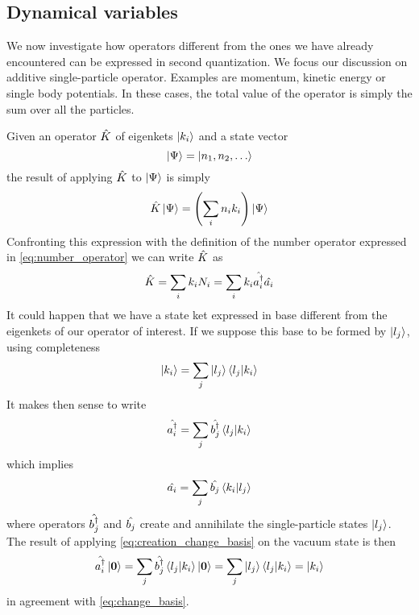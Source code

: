 \subsection{Dynamical variables}
We now investigate how operators different from the ones we have already encountered can be expressed in second quantization. We focus our discussion on additive single-particle operator. Examples are momentum, kinetic energy or single body potentials. In these cases, the total value of the operator is simply the sum over all the particles.

Given an operator $\hat{K}$ of eigenkets $\ket{k_i}$ and a state vector
\begin{equation}
    \ket{\Psi} = \ket{n_1, n_2, \dots}
\end{equation}
the result of applying $\hat{K}$ to $\ket{\Psi}$ is simply
\begin{equation}
    \hat{K}\ket{\Psi} = \left( \sum_i n_i k_i \right) \ket{\Psi}
\end{equation}
Confronting this expression with the definition of the number operator expressed in \cref{eq:number_operator} we can write $\hat{K}$ as
\begin{equation}
    \hat{K} = \sum_i k_i N_i = \sum_i k_i  \hat{a_i^\dagger}\hat{a_i}
\end{equation}
It could happen that we have a state ket expressed in base different from the eigenkets of our operator of interest. If we suppose this base to be formed by $\ket{l_j}$, using completeness
\begin{equation} \label{eq:change_basis}
    \ket{k_i} = \sum_j \ket{l_j} \braket{l_j}{k_i}
\end{equation}
It makes then sense to write
\begin{equation} \label{eq:creation_change_basis}
    \hat{a_i^\dagger} = \sum_j \hat{b_j^\dagger} \braket{l_j}{k_i}
\end{equation}
which implies
\begin{equation}
    \hat{a_i} = \sum_j \hat{b_j} \braket{k_i}{l_j}
\end{equation}
where operators $\hat{b_j^\dagger}$ and $\hat{b_j}$ create and annihilate the single-particle states $\ket{l_j}$. The result of applying \cref{eq:creation_change_basis} on the vacuum state is then
\begin{equation}
    \hat{a_i^\dagger} \ket{\mathbf{0}} = \sum_j \hat{b_j^\dagger} \braket{l_j}{k_i} \ket{\mathbf{0}} = \sum_j \ket{l_j} \braket{l_j}{k_i} = \ket{k_i}
\end{equation}
in agreement with \cref{eq:change_basis}.

